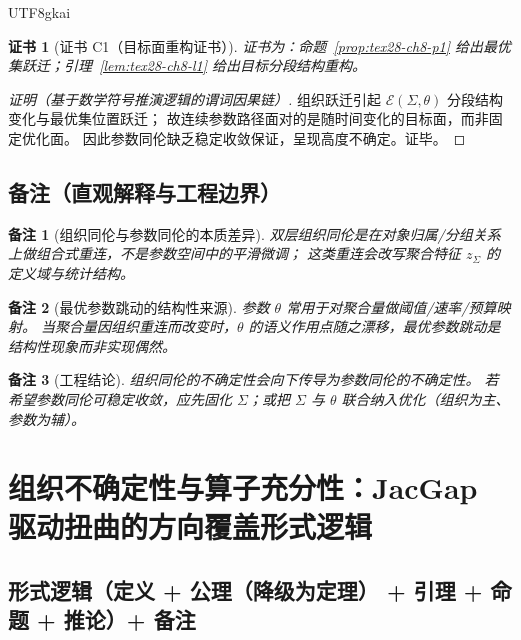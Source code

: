 \documentclass[12pt]{article}
\newtheorem{remark}{备注}[section]
\newtheorem{Certificate}{证书}[section]
\begin{document}
\begin{CJK*}{UTF8}{gkai}
\begin{Certificate}[证书 C1（目标面重构证书）]
\label{cert:tex28-ch8-c1}
证书为：命题~\ref{prop:tex28-ch8-p1} 给出最优集跃迁；引理~\ref{lem:tex28-ch8-l1} 给出目标分段结构重构。
\end{Certificate}

\begin{proof}[证明（基于数学符号推演逻辑的谓词因果链）]
组织跃迁引起 $\mathcal{E}(\Sigma,\theta)$ 分段结构变化与最优集位置跃迁；
故连续参数路径面对的是随时间变化的目标面，而非固定优化面。
因此参数同伦缺乏稳定收敛保证，呈现高度不确定。证毕。
\end{proof}

\subsection{备注（直观解释与工程边界）}
\label{subsec:tex28-ch8-remarks}

\begin{remark}[组织同伦与参数同伦的本质差异]
双层组织同伦是在对象归属/分组关系上做组合式重连，不是参数空间中的平滑微调；
这类重连会改写聚合特征 $z_{\Sigma}$ 的定义域与统计结构。
\end{remark}

\begin{remark}[最优参数跳动的结构性来源]
参数 $\theta$ 常用于对聚合量做阈值/速率/预算映射。
当聚合量因组织重连而改变时，$\theta$ 的语义作用点随之漂移，最优参数跳动是结构性现象而非实现偶然。
\end{remark}

\begin{remark}[工程结论]
组织同伦的不确定性会向下传导为参数同伦的不确定性。
若希望参数同伦可稳定收敛，应先固化 $\Sigma$；或把 $\Sigma$ 与 $\theta$ 联合纳入优化（组织为主、参数为辅）。
\end{remark}

\clearpage

\section{组织不确定性与算子充分性：JacGap 驱动扭曲的方向覆盖形式逻辑}
\label{sec:tex28-ch9}

\subsection{形式逻辑（定义 + 公理（降级为定理） + 引理 + 命题 + 推论）+ 备注}
\label{subsec:tex28-ch9-logic-structure}


\end{CJK*}
\end{document}
